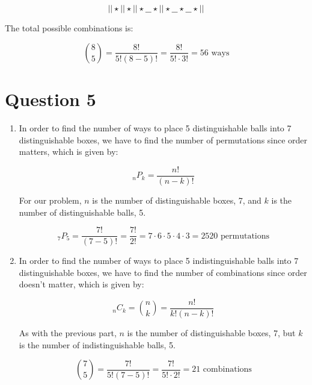 \documentclass[11pt]{article}
\begin{document}
\[|| \star || \star || \star \underline{\hspace{0.25cm}} \star || \star \underline{\hspace{0.25cm}} \star \underline{\hspace{0.25cm}} \star ||\]

The total possible combinations is:

\[\binom{8}{5} = \frac{8!}{5!(8-5)!} = \frac{8!}{5! \cdot 3!} = 56 \text{ ways}\]

\section*{Question 5}
\renewcommand{\labelenumi}{(\alph{enumi})}

\begin{enumerate}
    \item In order to find the number of ways to place 5 distinguishable balls into 7 distinguishable boxes, we have to find the number of permutations since order matters, which is given by: 
    
    \[_{n}P_{k} = \frac{n!}{(n-k)!}\]
    
    For our problem, $n$ is the number of distinguishable boxes, 7, and $k$ is the number of distinguishable balls, 5.
    
    \[_{7}P_{5} = \frac{7!}{(7-5)!} = \frac{7!}{2!} = 7 \cdot 6 \cdot 5 \cdot 4 \cdot 3 = 2520 \text{ permutations}\]
    
    \item In order to find the number of ways to place 5 indistinguishable balls into 7 distinguishable boxes, we have to find the number of combinations since order doesn't matter, which is given by:
    
    \[_{n}C_{k} = \binom{n}{k} = \frac{n!}{k!(n-k)!}\]
    
    As with the previous part, $n$ is the number of distinguishable boxes, 7, but $k$ is the number of indistinguishable balls, 5.
    
    \[\binom{7}{5} = \frac{7!}{5!(7-5)!} = \frac{7!}{5! \cdot 2!} = 21 \text{ combinations}\]
\end{enumerate}
\end{document}
